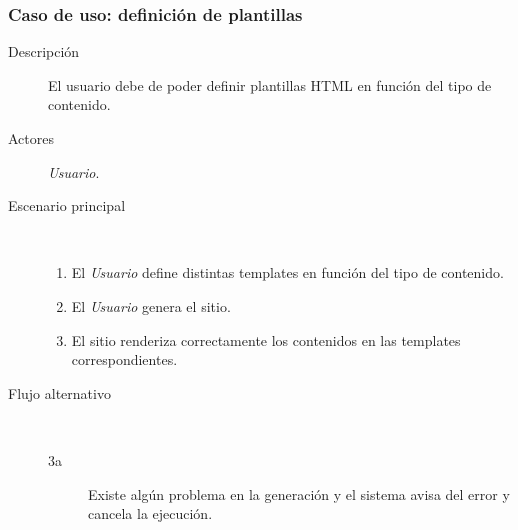 \subsubsection{Caso de uso: definición de plantillas}

\begin{description}
    \item[Descripción] El usuario debe de poder definir plantillas HTML en función del tipo de contenido.
    \item[Actores] \textit{Usuario}.
    \item[Escenario principal] $\quad$
        \begin{enumerate}
            \item El \textit{Usuario} define distintas templates en función del tipo de contenido.
            \item El \textit{Usuario} genera el sitio.
            \item El sitio renderiza correctamente los contenidos en las templates correspondientes.
        \end{enumerate}
    \item[Flujo alternativo] $\quad$
        \begin{description}
            \item[3a] Existe algún problema en la generación y el sistema avisa del error
                y cancela la ejecución.
        \end{description}
\end{description}


